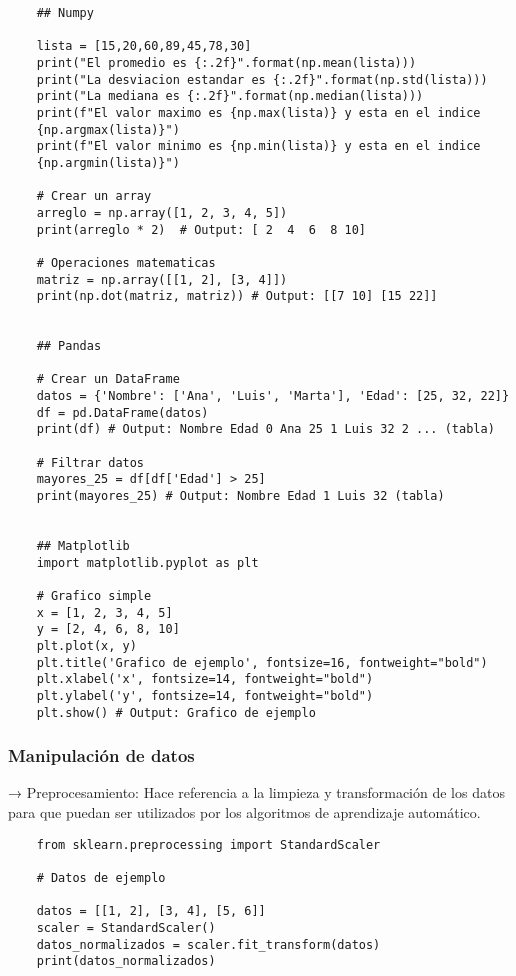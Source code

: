 \documentclass{templateNote}
\begin{document}
\begin{lstlisting}
    ## Numpy

    lista = [15,20,60,89,45,78,30]
    print("El promedio es {:.2f}".format(np.mean(lista)))
    print("La desviacion estandar es {:.2f}".format(np.std(lista)))
    print("La mediana es {:.2f}".format(np.median(lista)))
    print(f"El valor maximo es {np.max(lista)} y esta en el indice 
    {np.argmax(lista)}")
    print(f"El valor minimo es {np.min(lista)} y esta en el indice 
    {np.argmin(lista)}")

    # Crear un array
    arreglo = np.array([1, 2, 3, 4, 5])
    print(arreglo * 2)  # Output: [ 2  4  6  8 10]

    # Operaciones matematicas
    matriz = np.array([[1, 2], [3, 4]])
    print(np.dot(matriz, matriz)) # Output: [[7 10] [15 22]]


    ## Pandas

    # Crear un DataFrame
    datos = {'Nombre': ['Ana', 'Luis', 'Marta'], 'Edad': [25, 32, 22]}
    df = pd.DataFrame(datos)
    print(df) # Output: Nombre Edad 0 Ana 25 1 Luis 32 2 ... (tabla)

    # Filtrar datos
    mayores_25 = df[df['Edad'] > 25]
    print(mayores_25) # Output: Nombre Edad 1 Luis 32 (tabla)


    ## Matplotlib
    import matplotlib.pyplot as plt

    # Grafico simple
    x = [1, 2, 3, 4, 5]
    y = [2, 4, 6, 8, 10]
    plt.plot(x, y)
    plt.title('Grafico de ejemplo', fontsize=16, fontweight="bold")
    plt.xlabel('x', fontsize=14, fontweight="bold")
    plt.ylabel('y', fontsize=14, fontweight="bold")
    plt.show() # Output: Grafico de ejemplo 
\end{lstlisting}

\newpage
\subsubsection*{Manipulación de datos}

 → Preprocesamiento: Hace referencia a la limpieza y transformación de los datos para que puedan ser utilizados por los algoritmos de aprendizaje automático.
\begin{lstlisting}
    from sklearn.preprocessing import StandardScaler

    # Datos de ejemplo

    datos = [[1, 2], [3, 4], [5, 6]]
    scaler = StandardScaler()
    datos_normalizados = scaler.fit_transform(datos)
    print(datos_normalizados)
\end{lstlisting}
\end{document}
